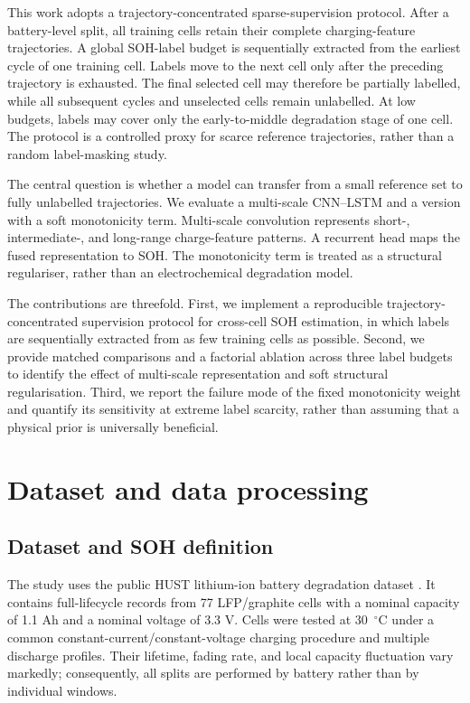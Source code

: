 \documentclass[pdflatex,sn-mathphys-num]{sn-jnl}
\begin{document}
This work adopts a trajectory-concentrated sparse-supervision protocol. After a battery-level split, all training cells retain their complete charging-feature trajectories. A global SOH-label budget is sequentially extracted from the earliest cycle of one training cell. Labels move to the next cell only after the preceding trajectory is exhausted. The final selected cell may therefore be partially labelled, while all subsequent cycles and unselected cells remain unlabelled. At low budgets, labels may cover only the early-to-middle degradation stage of one cell. The protocol is a controlled proxy for scarce reference trajectories, rather than a random label-masking study.

The central question is whether a model can transfer from a small reference set to fully unlabelled trajectories. We evaluate a multi-scale CNN--LSTM and a version with a soft monotonicity term. Multi-scale convolution represents short-, intermediate-, and long-range charge-feature patterns. A recurrent head maps the fused representation to SOH. The monotonicity term is treated as a structural regulariser, rather than an electrochemical degradation model.

The contributions are threefold. First, we implement a reproducible trajectory-concentrated supervision protocol for cross-cell SOH estimation, in which labels are sequentially extracted from as few training cells as possible. Second, we provide matched comparisons and a factorial ablation across three label budgets to identify the effect of multi-scale representation and soft structural regularisation. Third, we report the failure mode of the fixed monotonicity weight and quantify its sensitivity at extreme label scarcity, rather than assuming that a physical prior is universally beneficial.

\section{Dataset and data processing}
\label{sec:data}

\subsection{Dataset and SOH definition}
\label{subsec:dataset}

The study uses the public HUST lithium-ion battery degradation dataset \cite{Yuan2022HUSTDataset}. It contains full-lifecycle records from 77 LFP/graphite cells with a nominal capacity of 1.1 Ah and a nominal voltage of 3.3 V. Cells were tested at 30~$^{\circ}$C under a common constant-current/constant-voltage charging procedure and multiple discharge profiles. Their lifetime, fading rate, and local capacity fluctuation vary markedly; consequently, all splits are performed by battery rather than by individual windows.
\end{document}
